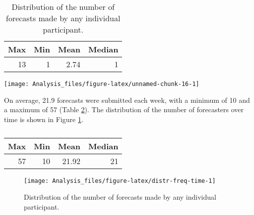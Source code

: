 \documentclass[
]{article}
\begin{document}
\begin{table}

\caption{\label{tab:summary-active}Distribution of the number of forecasts made by any individual participant.}
\centering
\begin{tabular}[t]{r|r|r|r}
\hline
Max & Min & Mean & Median\\
\hline
13 & 1 & 2.74 & 1\\
\hline
\end{tabular}
\end{table}

\texttt{[image: Analysis\_files/figure-latex/unnamed-chunk-16-1]}

On average, 21.9 forecasts were submitted each week, with a minimum of 10 and a maximum of 57 (Table \ref{tab:summary-freq-time}). The distribution of the number of forecasters over time is shown in Figure \ref{fig:distr-freq-time}.

\begin{table}

\caption{\label{tab:summary-freq-time}}
\centering
\begin{tabular}[t]{r|r|r|r}
\hline
Max & Min & Mean & Median\\
\hline
57 & 10 & 21.92 & 21\\
\hline
\end{tabular}
\end{table}

\begin{figure}
\texttt{[image: Analysis\_files/figure-latex/distr-freq-time-1]} \caption{Distribution of the number of forecasts made by any individual participant.}\label{fig:distr-freq-time}
\end{figure}
\end{document}
